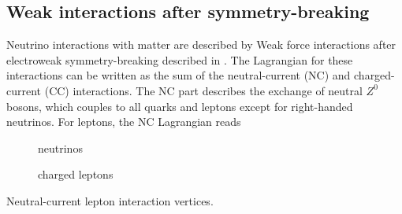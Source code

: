 \subsection{Weak interactions after symmetry-breaking}
Neutrino interactions with matter are described by Weak force interactions after electroweak symmetry-breaking described in .
The Lagrangian for these interactions can be written as the sum of the neutral-current (NC) and charged-current (CC) interactions. The NC part describes the exchange of neutral $Z^0$ bosons, which couples to all quarks and leptons except for right-handed neutrinos. For leptons, the NC Lagrangian reads
\begin{marginfigure}
\centering
\begin{subfigure}[t]{0.49\linewidth}
    \caption{neutrinos}
\end{subfigure}
\begin{subfigure}[t]{0.49\linewidth}
    \caption{charged leptons}
\end{subfigure}
\caption{Neutral-current lepton interaction vertices.}
\label{fig:nc-vertices}
\end{marginfigure}
